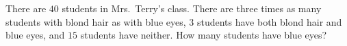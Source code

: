 There are $40$ students in Mrs.\ Terry's class. There are three times as many students with blond hair as with blue eyes, $3$ students have both blond hair and blue eyes, and $15$ students have neither. How many students have blue eyes?
